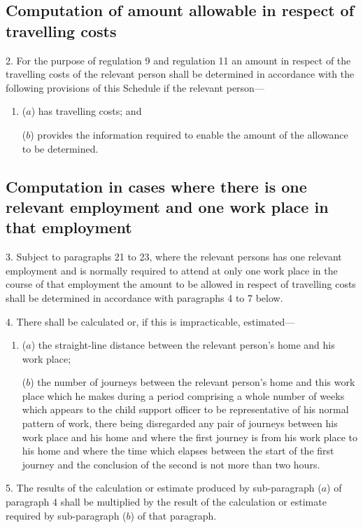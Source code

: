\documentclass[12pt,a4paper]{article}
\begin{document}
\subsection*{Computation of amount allowable in respect of travelling costs}

2.  For the purpose of regulation 9 and regulation 11 an amount in respect of the travelling costs of the relevant person shall be determined in accordance with the following provisions of this Schedule if the relevant person—
\begin{enumerate}\item[]
($a$) has travelling costs; and

($b$) provides the information required to enable the amount of the allowance to be determined.
\end{enumerate}

\subsection*{Computation in cases where there is one relevant employment and one work place in that employment}

3.  Subject to paragraphs 21 to 23, where the relevant persons has one relevant employment and is normally required to attend at only one work place in the course of that employment the amount to be allowed in respect of travelling costs shall be determined in accordance with paragraphs 4 to 7 below.

\medskip

4.  There shall be calculated or, if this is impracticable, estimated—
\begin{enumerate}\item[]
($a$) the straight-line distance between the relevant person’s home and his work place;

($b$) the number of journeys between the relevant person’s home and this work place which he makes during a period comprising a whole number of weeks which appears to the child support officer to be representative of his normal pattern of work, there being disregarded any pair of journeys between his work place and his home and where the first journey is from his work place to his home and where the time which elapses between the start of the first journey and the conclusion of the second is not more than two hours.
\end{enumerate}

\medskip

5.  The results of the calculation or estimate produced by sub-paragraph ($a$) of paragraph 4 shall be multiplied by the result of the calculation or estimate required by sub-paragraph ($b$) of that paragraph.
\end{document}
